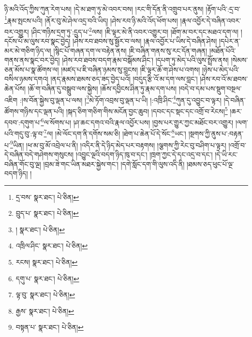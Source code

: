 ཉི་མའི་འོད་ཀྱིས་ཀུན་རེག་པས། །དེ་མ་ཐག་ཏུ་མེ་འབར་བས། །རང་གི་དོན་ནི་འགྲུབ་པར་ནུས། །རྟོག་པའི་:དྲ་བ་\footnote{དྲ་བས་  སྣར་ཐང་།  པེ་ཅིན། }རྣམ་སྤངས་པའི། །ནོར་བུ་མེ་ཤེལ་འདྲ་བའི་ཡིད། །ཤེས་རབ་ཉི་མའི་འོད་ཕོག་པས། །རྣལ་འབྱོར་དེ་བཞིན་འབར་བར་འགྱུར། །ཤིང་གཉིས་དྲག་ཏུ་:དྲུད་པ་\footnote{བྲུད་པ་  སྣར་ཐང་།  པེ་ཅིན། }ལས། །ཇི་ལྟར་མེ་ནི་འབར་འགྱུར་བ། །ཐོག་མ་བར་དང་མཐའ་དག་ལ། །དངོས་པོ་མ་ལུས་རབ་སྣང་བྱེད། །ཤེས་རབ་ཐབས་སུ་སྦྱོར་བ་ལས། །རྣལ་འབྱོར་པ་ཡིས་དེ་བཞིན་ཤེས། །དཔེར་ན་མར་མེ་གཅིག་ཉིད་ལ། །སྙིང་པོ་གཞན་དག་ལ་བརྟེན་ནས། །ཇི་བཞིན་གནས་སུ་རང་དོན་གཞན། །མཐོན་པོའི་གནས་ནས་སྣང་བར་བྱེད། །ཤེས་རབ་ཐབས་བདག་རྣམ་བསྒོམས་ཤིང་། །དཔག་ཏུ་མེད་པའི་ལུས་སྤྲོས་ནས། །སེམས་ཅན་མོས་པ་སྣ་ཚོགས་ལ། །མཛད་པ་ཇི་བཞིན་ཉམས་སུ་བླངས། །ཇི་ལྟར་ཆོ་ག་ཤེས་པ་འགས། །ཉེས་པ་མེད་པའི་བསིལ་ཉམས་དགའ། །ནད་རྣམས་ཐམས་ཅད་ཟད་བྱེད་པའོ། །བདུད་རྩི་འོ་མ་དག་ལས་བླང་། །ཤེས་རབ་འོ་མ་ཐབས་ཆེན་པོས། །ཆོ་ག་བཞིན་དུ་བསྒྲུབ་ལས་སྐྱེས། །ཆོས་དབྱིངས་ཤིན་ཏུ་རྣམ་དག་པས། །བདེ་བ་དམ་པས་སྡུག་བསྔལ་འཇིག :།ས་བོན་སྐྱེས་བུ་ལྡན་པ་ལས། །\footnote{།  སྣར་ཐང་།  པེ་ཅིན། }མེ་ཏོག་འབྲས་བུ་ལྡན་པ་ཡི། །:འཁྲི་ཤིང་\footnote{འཁྲིལ་ཤིང་  སྣར་ཐང་།  པེ་ཅིན། }ཀུན་དུ་འབྱུང་བ་ལྟར། །དེ་བཞིན་ཚོགས་གཉིས་དང་ལྡན་པའི། །སྐད་ཅིག་གཅིག་གིས་མངོན་བྱང་ཆུབ། །དབང་དང་སྡང་དང་འགྲོ་བ་རེངས།\footnote{རངས།  སྣར་ཐང་།  པེ་ཅིན། } །ཆར་དབབ་:དགུག་པ་\footnote{དགུ་པ་  སྣར་ཐང་།  པེ་ཅིན། }ལ་སོགས་པ། །ཤ་ཆང་དགའ་བའི་རྣལ་འབྱོར་པས། །བྱས་པར་གྱུར་ཀྱང་མཐོང་བར་འགྱུར། །ལག་པའི་གདུ་བུ་:ལྟ་བ་\footnote{ལྟ་བུ་  སྣར་ཐང་།  པེ་ཅིན། }ལ། །མེ་ལོང་དག་ནི་དགོས་སམ་ཅི། །ཐེག་པ་ཆེན་པོ་དེ་སོང་\footnote{རྒྱས་  སྣར་ཐང་།  པེ་ཅིན། }ཡང་། །སྔགས་ཀྱི་ནུས་པ་:བརྟན་པ་\footnote{བསྟན་པ་  སྣར་ཐང་།  པེ་ཅིན། }ཡིན། །ཕ་མ་བུ་མོ་འབྲེལ་པ་ནི། །འདིར་ནི་དེ་ཉིད་མེད་པར་བརྟགས། །ལྕགས་ཀྱི་རེང་བུ་བཤིག་པ་ལྟར། །འགྲོ་བ་དེ་བཞིན་བདེ་གཤེགས་གསུངས། །འབྱུང་ལྔའི་བདག་ཉིད་ཁུ་བ་དང་། །ཁྲག་ཀྱང་དེ་དང་འདྲ་བ་དང་། །དེ་ཡི་རང་བཞིན་གོང་བུ་ལྔ། །བྲམ་ཟེ་གང་ཡིན་མཐར་སྐྱེས་གང་། །དགེ་སློང་དག་གི་ལུས་འདི་ནི། །ཐམས་ཅད་ཕུང་པོ་ལྔ་བདག་ཉིད། །
